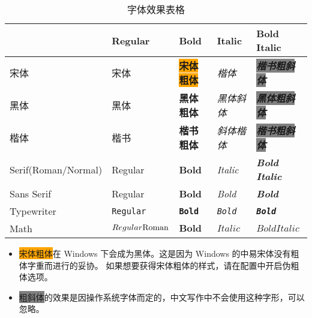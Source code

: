 \begin{table}[htb]
    \linespread{1.5}
    \centering
    \caption{字体效果表格}
    \begin{tabular}{@{}lllll@{}}
    \toprule
               & Regular & Bold & Italic & Bold Italic \\ \midrule
      宋体       & 宋体      & \colorbox{orange}{\textbf{宋体粗体}} & \textit{楷体}     &   \colorbox{gray}{\textbf{\textit{楷书粗斜体}}}  \\
      黑体         & {\heiti{}黑体}      & \textbf{\heiti{}黑体粗体} &   \textit{\heiti{}黑体斜体}     & \colorbox{gray}{\textit{\textbf{\heiti{}黑体粗斜体}}}   \\
      楷体         & {\kaishu{}楷书}      & \textbf{\kaishu{}楷书粗体} & \textit{\kaishu{}斜体楷体} &  \colorbox{gray}{\textbf{\textit{\kaishu{}楷书粗斜体}}}    \\
    Serif(Roman/Normal)      &    Regular    &  \textbf{Bold}  &    \textit{Italic}    &     \textbf{\textit{Bold Italic}}    \\
    Sans Serif &  \textsf{Regular}       &  \textbf{\textsf{Bold}}    &  \textit{\textsf{Bold}}   &    \textbf{\textit{\textsf{Bold}}}   \\
    Typewriter &  \texttt{Regular}       &  \textbf{\texttt{Bold}}    &  \textit{\texttt{Bold}}   &    \textbf{\textit{\texttt{Bold}}}   \\
    Math       &   $\mathnormal{Regular} \mathrm{Roman}$  & $\mathbf{Bold}$   &    $\mathit{Italic}$    &  $\mathbf{\mathit{Bold Italic}}$    \\ \bottomrule
    \end{tabular}
\end{table}

\begin{itemize}[nosep]
  \item \colorbox{orange}{宋体粗体}在 Windows 下会成为黑体。这是因为 Windows 的中易宋体没有粗体字重而进行的妥协。
    如果想要获得宋体粗体的样式，请在配置中开启伪粗体选项。
  \item \colorbox{gray}{粗斜体}的效果是因操作系统字体而定的，中文写作中不会使用这种字形，可以忽略。
\end{itemize}
